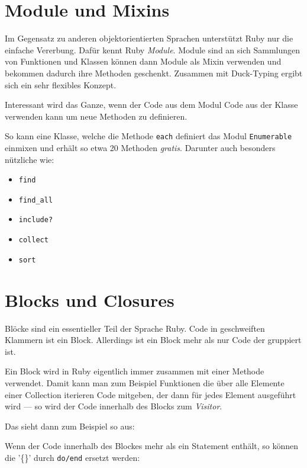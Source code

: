 \documentclass[a4book,11pt,twoside]{scrbook}
\begin{document}
\section{Module und Mixins} %
\label{sec:module_und_mixin}
Im Gegensatz zu anderen objektorientierten Sprachen unterstützt Ruby nur die einfache Vererbung. Dafür kennt Ruby \emph{Module}. Module sind an sich Sammlungen von Funktionen und Klassen können dann Module als Mixin verwenden und bekommen dadurch ihre Methoden geschenkt. Zusammen mit Duck-Typing ergibt sich ein sehr flexibles Konzept.

Interessant wird das Ganze, wenn der Code aus dem Modul Code aus der Klasse verwenden kann um neue Methoden zu definieren.

So kann eine Klasse, welche die Methode \texttt{each} definiert das Modul \texttt{Enumerable} einmixen und erhält so etwa 20 Methoden \emph{gratis}. Darunter auch besonders nützliche wie:
\begin{itemize}
	\item \texttt{find}
	\item \texttt{find\_all}
	\item \texttt{include?}
	\item \texttt{collect}
	\item \texttt{sort}
\end{itemize}


\section{Blocks und Closures} %
\label{sec:blocks_und_closures}
Blöcke sind ein essentieller Teil der Sprache Ruby. Code in geschweiften Klammern ist ein Block. Allerdings ist ein Block mehr als nur Code der gruppiert ist.

Ein Block wird in Ruby eigentlich immer zusammen mit einer Methode verwendet. Damit kann man zum Beispiel Funktionen die über alle Elemente einer Collection iterieren Code mitgeben, der dann für jedes Element ausgeführt wird — so wird der Code innerhalb des Blocks zum \emph{Visitor}.

Das sieht dann zum Beispiel so aus:



Wenn der Code innerhalb des Blockes mehr als ein Statement enthält, so können die '\{\}' durch \texttt{do/end} ersetzt werden:


\end{document}
